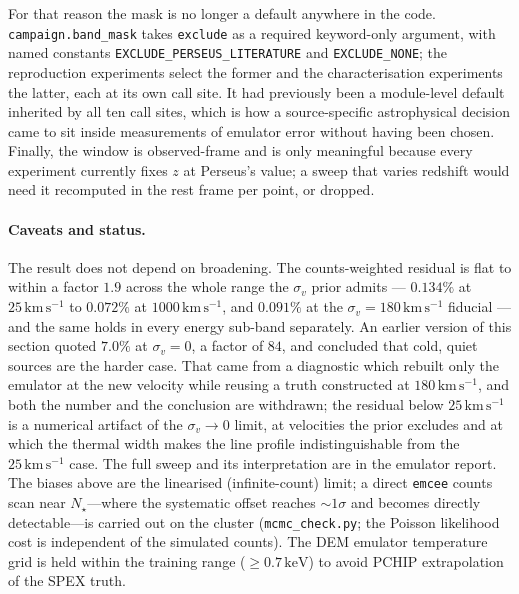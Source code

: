 \documentclass[11pt,a4paper]{article}
\newcommand{\kev}{\,\mathrm{keV}}
\newcommand{\kms}{\,\mathrm{km\,s^{-1}}}
\newcommand{\code}[1]{\texttt{#1}}
\begin{document}
For that reason the mask is no longer a default anywhere in the code.
\code{campaign.band\_mask} takes \code{exclude} as a required keyword-only
argument, with named constants \code{EXCLUDE\_PERSEUS\_LITERATURE} and
\code{EXCLUDE\_NONE}; the reproduction experiments select the former and the
characterisation experiments the latter, each at its own call site. It had
previously been a module-level default inherited by all ten call sites, which
is how a source-specific astrophysical decision came to sit inside
measurements of emulator error without having been chosen. Finally, the window
is observed-frame and is only meaningful because every experiment currently
fixes $z$ at Perseus's value; a sweep that varies redshift would need it
recomputed in the rest frame per point, or dropped.

\paragraph{Caveats and status.} The result does not depend on
broadening. The counts-weighted residual is flat to within a factor
$1.9$ across the whole range the $\sigma_v$ prior admits --- $0.134\%$ at
$25\kms$ to $0.072\%$ at $1000\kms$, and $0.091\%$ at the
$\sigma_v=180\kms$ fiducial --- and the same holds in every energy
sub-band separately. An earlier version of this section quoted $7.0\%$
at $\sigma_v=0$, a factor of $84$, and concluded that cold, quiet sources
are the harder case. That came from a diagnostic which rebuilt only the
emulator at the new velocity while reusing a truth constructed at
$180\kms$, and both the number and the conclusion are withdrawn; the
residual below $25\kms$ is a numerical artifact of the $\sigma_v \to 0$
limit, at velocities the prior excludes and at which the thermal width
makes the line profile indistinguishable from the $25\kms$ case. The
full sweep and its interpretation are in the emulator report. The biases above are the
linearised (infinite-count) limit; a direct \code{emcee} counts scan near
$N_\star$---where the systematic offset reaches $\sim1\sigma$ and becomes directly
detectable---is carried out on the cluster (\code{mcmc\_check.py}; the Poisson
likelihood cost is independent of the simulated counts). The DEM emulator
temperature grid is held within the training range ($\geq0.7\kev$) to avoid
PCHIP extrapolation of the SPEX truth.
\end{document}
